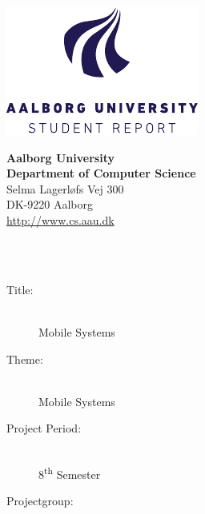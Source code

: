 \begin{titlepage}
    \setlength{\textwidth}{15cm}
    \noindent
    \begin{nopagebreak}
        \begin{minipage}{0.4\textwidth}
            \centering
            \includegraphics[width=\textwidth]{img/aau_logo_en.pdf}
        \end{minipage} \hfill
        \begin{minipage}{0.4\textwidth}
            \flushright
            \textbf{Aalborg University}\\
            \textbf{Department of Computer Science}\\
            Selma Lagerløfs Vej 300\\
            DK-9220 Aalborg\\
            \url{http://www.cs.aau.dk}
        \end{minipage}\\
        \vspace{1cm}\\
        \begin{minipage}[t]{0.4\textwidth}
            \begin{description}
                \item[Title:] \hfill\\
                    Mobile Systems
                \item[Theme:] \hfill\\
                    Mobile Systems
                \item[Project Period:] \hfill\\
                    8\textsuperscript{th} Semester
                \item[Projectgroup:] \hfill\\

\end{description}
\end{minipage}
\end{nopagebreak}
\end{titlepage}

